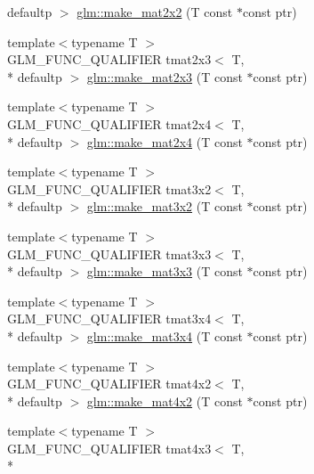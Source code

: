 \begin{DoxyCompactItemize}
defaultp $>$ \hyperlink{group__gtc__type__ptr_gadb29e510762e1042069cb28bf24ae990}{glm\-::make\-\_\-mat2x2} (T const $\ast$const ptr)
\item 
{\footnotesize template$<$typename T $>$ }\\G\-L\-M\-\_\-\-F\-U\-N\-C\-\_\-\-Q\-U\-A\-L\-I\-F\-I\-E\-R tmat2x3$<$ T, \\*
defaultp $>$ \hyperlink{group__gtc__type__ptr_ga37988c6dd941f617cdfab86d54375fc1}{glm\-::make\-\_\-mat2x3} (T const $\ast$const ptr)
\item 
{\footnotesize template$<$typename T $>$ }\\G\-L\-M\-\_\-\-F\-U\-N\-C\-\_\-\-Q\-U\-A\-L\-I\-F\-I\-E\-R tmat2x4$<$ T, \\*
defaultp $>$ \hyperlink{group__gtc__type__ptr_ga6dfb2ac10859b0cc8e3893ea84fa95b5}{glm\-::make\-\_\-mat2x4} (T const $\ast$const ptr)
\item 
{\footnotesize template$<$typename T $>$ }\\G\-L\-M\-\_\-\-F\-U\-N\-C\-\_\-\-Q\-U\-A\-L\-I\-F\-I\-E\-R tmat3x2$<$ T, \\*
defaultp $>$ \hyperlink{group__gtc__type__ptr_gabe1e5066608a66da7a94f802b57b4eed}{glm\-::make\-\_\-mat3x2} (T const $\ast$const ptr)
\item 
{\footnotesize template$<$typename T $>$ }\\G\-L\-M\-\_\-\-F\-U\-N\-C\-\_\-\-Q\-U\-A\-L\-I\-F\-I\-E\-R tmat3x3$<$ T, \\*
defaultp $>$ \hyperlink{group__gtc__type__ptr_ga3cbe7adf857c867cee77eae4617abadd}{glm\-::make\-\_\-mat3x3} (T const $\ast$const ptr)
\item 
{\footnotesize template$<$typename T $>$ }\\G\-L\-M\-\_\-\-F\-U\-N\-C\-\_\-\-Q\-U\-A\-L\-I\-F\-I\-E\-R tmat3x4$<$ T, \\*
defaultp $>$ \hyperlink{group__gtc__type__ptr_gac083edd180ab4d4b817acc60c516209b}{glm\-::make\-\_\-mat3x4} (T const $\ast$const ptr)
\item 
{\footnotesize template$<$typename T $>$ }\\G\-L\-M\-\_\-\-F\-U\-N\-C\-\_\-\-Q\-U\-A\-L\-I\-F\-I\-E\-R tmat4x2$<$ T, \\*
defaultp $>$ \hyperlink{group__gtc__type__ptr_ga967a5b934e67ff9a6d1d0d27a377a264}{glm\-::make\-\_\-mat4x2} (T const $\ast$const ptr)
\item 
{\footnotesize template$<$typename T $>$ }\\G\-L\-M\-\_\-\-F\-U\-N\-C\-\_\-\-Q\-U\-A\-L\-I\-F\-I\-E\-R tmat4x3$<$ T, \\*

\end{DoxyCompactItemize}
